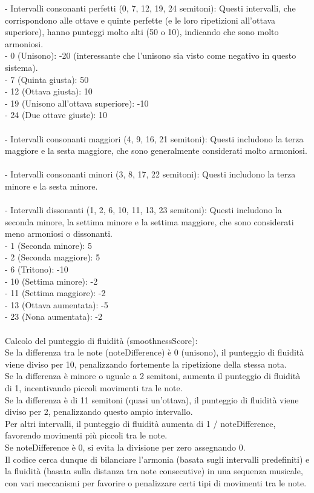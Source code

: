 \documentclass[a4paper,12pt]{report}
\begin{document}
- Intervalli consonanti perfetti (0, 7, 12, 19, 24 semitoni): Questi intervalli, che corrispondono alle ottave e quinte perfette (e le loro ripetizioni all'ottava superiore), hanno punteggi molto alti (50 o 10), indicando che sono molto armoniosi. \\
    - 0 (Unisono): -20 (interessante che l'unisono sia visto come negativo in questo sistema). \\
    - 7 (Quinta giusta): 50 \\
    - 12 (Ottava giusta): 10 \\
    - 19 (Unisono all'ottava superiore): -10 \\
    - 24 (Due ottave giuste): 10 \\
\\
- Intervalli consonanti maggiori (4, 9, 16, 21 semitoni): Questi includono la terza maggiore e la sesta maggiore, che sono generalmente considerati molto armoniosi. \\
\\
- Intervalli consonanti minori (3, 8, 17, 22 semitoni): Questi includono la terza minore e la sesta minore. \\
\\
- Intervalli dissonanti (1, 2, 6, 10, 11, 13, 23 semitoni): Questi includono la seconda minore, la settima minore e la settima maggiore, che sono considerati meno armoniosi o dissonanti. \\
    - 1 (Seconda minore): 5 \\
    - 2 (Seconda maggiore): 5 \\
    - 6 (Tritono): -10 \\
    - 10 (Settima minore): -2 \\
    - 11 (Settima maggiore): -2 \\
    - 13 (Ottava aumentata): -5 \\
    - 23 (Nona aumentata): -2 \\
\\
Calcolo del punteggio di fluidità (smoothnessScore): \\
Se la differenza tra le note (noteDifference) è 0 (unisono), il punteggio di fluidità viene diviso per 10, penalizzando fortemente la ripetizione della stessa nota. \\
Se la differenza è minore o uguale a 2 semitoni, aumenta il punteggio di fluidità di 1, incentivando piccoli movimenti tra le note. \\
Se la differenza è di 11 semitoni (quasi un'ottava), il punteggio di fluidità viene diviso per 2, penalizzando questo ampio intervallo. \\
Per altri intervalli, il punteggio di fluidità aumenta di 1 / noteDifference, favorendo movimenti più piccoli tra le note. \\
Se noteDifference è 0, si evita la divisione per zero assegnando 0. \\
Il codice cerca dunque di bilanciare l'armonia (basata sugli intervalli predefiniti) e la fluidità (basata sulla distanza tra note consecutive) in una sequenza musicale, con vari meccanismi per favorire o penalizzare certi tipi di movimenti tra le note. 
\end{document}
